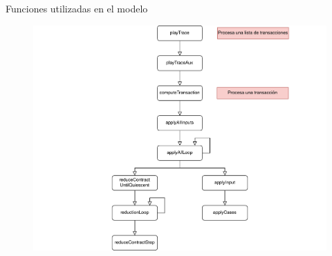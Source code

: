 \documentclass{beamer}
\begin{document}
{\begin{frame}[fragile]{Funciones utilizadas en el modelo}
{\begin{figure}[H]
        \includegraphics[height=0.8\textheight]{Dependencias_Isabelle_Marlowe_2.png}
    \end{figure}
}
\end{frame}}
\end{document}
